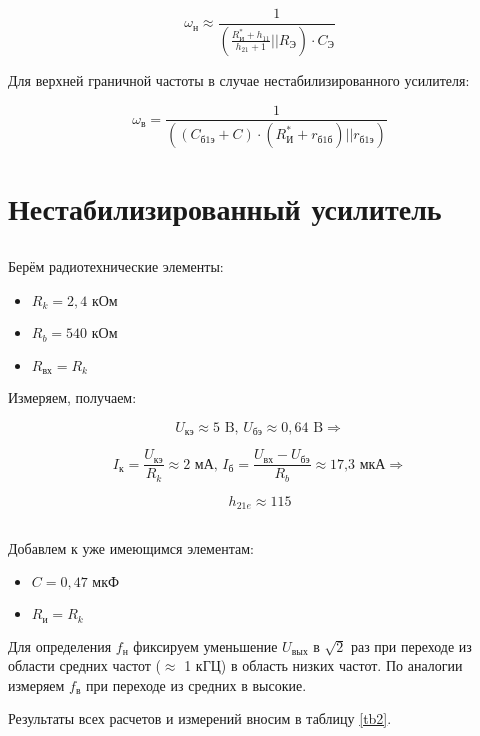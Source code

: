 \documentclass[15pt,a5paper,reqno]{article}
\begin{document}
\[  \omega_н \approx \frac{1}{\left(\frac{R_И^{*} + h_{11}}{h_{21} + 1} || R_Э\right) \cdot C_Э}   \]

Для верхней граничной частоты в случае нестабилизированного усилителя:

\[ \omega_в = \frac{1}{ \left( \left(  C_{б1э} + C  \right) \cdot (R_{И}^{*} + r_{б1б}) || r_{б1э}     \right)  } \]

\section{Нестабилизированный усилитель}

\subsection{}

Берём радиотехнические элементы:

\begin{itemize}
  \item $R_k = 2,4 \text{ кОм}$
  \item $R_b = 540 \text{ кОм}$
  \item $R_{вх} = R_k$
\end{itemize}

Измеряем, получаем: 

\[ U_{кэ} \approx 5 \text{ B, } U_{бэ} \approx 0,64 \text{ B} \Rightarrow  \]

\[ I_{к} = \frac{U_{кэ}}{R_k} \approx 2 \text{ мА, } I_{б} = \frac{U_{вх} - U_{бэ}}{R_b} \approx  \text{17,3 мкА} \Rightarrow  \]

\[ h_{21e} \approx 115 \]

\subsection{}

Добавлем к уже имеющимся элементам:

\begin{itemize}

  \item $C = 0,47 \text{ мкФ}$
  \item $R_{и} = R_k$
\end{itemize}

Для определения $f_н$ фиксируем уменьшение $U_{вых}$ в $\sqrt{2}$ раз при переходе из области средних частот ($\approx$ 1 кГЦ) в область низких частот.
По аналогии измеряем $f_в$ при переходе из средних в высокие.
 
Результаты всех расчетов и измерений вносим в таблицу \ref{tb2}.
\end{document}
